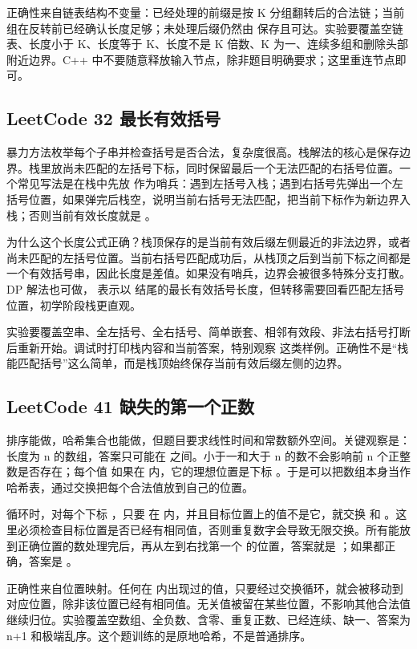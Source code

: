 正确性来自链表结构不变量：已经处理的前缀是按 K 分组翻转后的合法链；当前组在反转前已经确认长度足够；未处理后缀仍然由  保存且可达。实验要覆盖空链表、长度小于 K、长度等于 K、长度不是 K 倍数、K 为一、连续多组和删除头部附近边界。C++ 中不要随意释放输入节点，除非题目明确要求；这里重连节点即可。

\subsection{LeetCode 32 最长有效括号}

暴力方法枚举每个子串并检查括号是否合法，复杂度很高。栈解法的核心是保存边界。栈里放尚未匹配的左括号下标，同时保留最后一个无法匹配的右括号位置。一个常见写法是在栈中先放  作为哨兵：遇到左括号入栈；遇到右括号先弹出一个左括号位置，如果弹完后栈空，说明当前右括号无法匹配，把当前下标作为新边界入栈；否则当前有效长度就是 。

为什么这个长度公式正确？栈顶保存的是当前有效后缀左侧最近的非法边界，或者尚未匹配的左括号位置。当前右括号匹配成功后，从栈顶之后到当前下标之间都是一个有效括号串，因此长度是差值。如果没有哨兵，边界会被很多特殊分支打散。DP 解法也可做， 表示以  结尾的最长有效括号长度，但转移需要回看匹配左括号位置，初学阶段栈更直观。

实验要覆盖空串、全左括号、全右括号、简单嵌套、相邻有效段、非法右括号打断后重新开始。调试时打印栈内容和当前答案，特别观察 \code{)()())} 这类样例。正确性不是“栈能匹配括号”这么简单，而是栈顶始终保存当前有效后缀左侧的边界。

\subsection{LeetCode 41 缺失的第一个正数}

排序能做，哈希集合也能做，但题目要求线性时间和常数额外空间。关键观察是：长度为 n 的数组，答案只可能在  之间。小于一和大于 n 的数不会影响前 n 个正整数是否存在；每个值  如果在  内，它的理想位置是下标 。于是可以把数组本身当作哈希表，通过交换把每个合法值放到自己的位置。

循环时，对每个下标 ，只要  在  内，并且目标位置上的值不是它，就交换  和 。这里必须检查目标位置是否已经有相同值，否则重复数字会导致无限交换。所有能放到正确位置的数处理完后，再从左到右找第一个  的位置，答案就是 ；如果都正确，答案是 。

正确性来自位置映射。任何在  内出现过的值，只要经过交换循环，就会被移动到对应位置，除非该位置已经有相同值。无关值被留在某些位置，不影响其他合法值继续归位。实验覆盖空数组、全负数、含零、重复正数、已经连续、缺一、答案为 n+1 和极端乱序。这个题训练的是原地哈希，不是普通排序。

